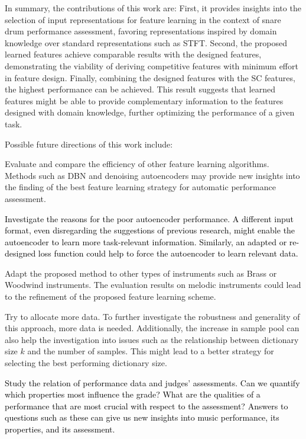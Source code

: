 \documentclass{ws-ijsc}
\newcommand{\highlight}[1]{\textcolor{black}{#1}}
\begin{document}
In summary, the contributions of this work are: 
First, it provides insights into the selection of input representations for feature learning in the context of snare drum performance assessment, favoring representations inspired by domain knowledge over standard representations such as STFT. 
Second, the proposed learned features achieve comparable results with the designed features, demonstrating the viability of deriving competitive features with minimum effort in feature design. 
Finally, combining the designed features with the SC features, the highest performance can be achieved. This result suggests that learned features might be able to provide complementary information to the features designed with domain knowledge, further optimizing the performance of a given task. 

Possible future directions of this work include: 
\begin{enumerate}[(i)]
    \item   Evaluate and compare the efficiency of other feature learning algorithms. Methods such as DBN\cite{Hamel2010} and denoising autoencoders \cite{Vincent2008} may provide new insights into the finding of the best feature learning strategy for automatic performance assessment.
    \highlight{\item   Investigate the reasons for the poor autoencoder performance. A different input format, even disregarding the suggestions of previous research, might enable the autoencoder to learn more task-relevant information. Similarly, an adapted or re-designed loss function could help to force the autoencoder to learn relevant data.}
    \item   Adapt the proposed method to other types of instruments such as Brass or Woodwind instruments. The evaluation results on melodic instruments could lead to the refinement of the proposed feature learning scheme. 
    \item   Try to allocate more data. To further investigate the robustness and generality of this approach, more data is needed. Additionally, the increase in sample pool can also help the investigation into issues such as the relationship between dictionary size $k$ and the number of samples. This might lead to a better strategy for selecting the best performing dictionary size. 
    \highlight{\item   Study the relation of performance data and judges' assessments. Can we quantify which properties most influence the grade? What are the qualities of a performance that are most crucial with respect to the assessment? Answers to questions such as these can give us new insights into music performance, its properties, and its assessment.}
\end{enumerate}
\end{document}
